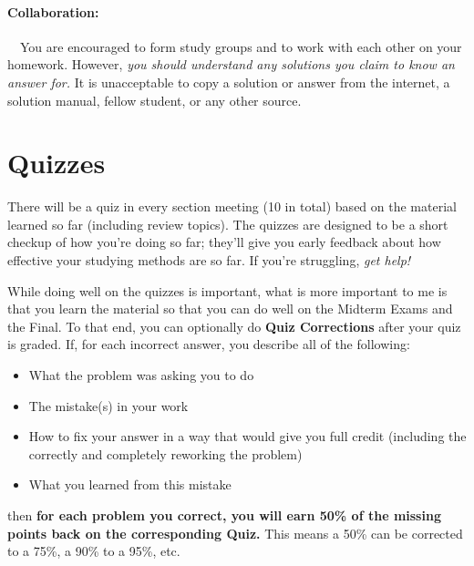 \documentclass[11pt,letterpaper]{article}
\begin{document}
\paragraph*{Collaboration:}\ \ You are encouraged to form study groups
and to work with each other on your homework.  However, \emph{you
  should understand any solutions you claim to know an answer for.}  It
is unacceptable to copy a solution or answer from the internet, a
solution manual, fellow student, or any other source.


\section*{Quizzes}
There will be a quiz in every section meeting (10 in total) based on the material learned so far (including review topics). The quizzes are designed to be a short checkup of how you're doing so far; they'll give you early feedback about how effective your studying methods are so far. If you're struggling, \textit{get help! }

While doing well on the quizzes is important, what is more important to me is that you learn the material so that you can do well on the Midterm Exams and the Final. To that end, you can optionally do \textbf{Quiz Corrections} after your quiz is graded. If, for each incorrect answer, you describe all of the following:
\begin{itemize}[nosep]
\item What the problem was asking you to do
\item The mistake(s) in your work
\item How to fix your answer in a way that would give you full credit (including the correctly and completely reworking the problem)
\item What you learned from this mistake
\end{itemize}
then \textbf{for each problem you correct, you will earn 50\% of the missing points back on the corresponding Quiz. }This means a 50\% can be corrected to a 75\%, a 90\% to a 95\%, etc. 
\end{document}
